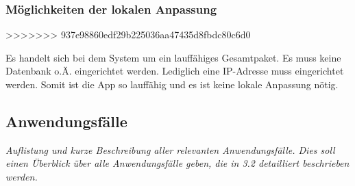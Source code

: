 \documentclass[fontsize=12pt,paper=a4,twoside]{scrartcl}
\begin{document}
\subsubsection{Möglichkeiten der lokalen Anpassung}
>>>>>>> 937e98860edf29b225036aa47435d8fbdc80c6d0

 Es handelt sich bei dem System um ein lauffähiges Gesamtpaket. Es muss keine Datenbank o.Ä. eingerichtet werden. Lediglich eine IP-Adresse muss eingerichtet werden. Somit ist die App so lauffähig und es ist keine lokale Anpassung nötig.


\subsection{Anwendungsfälle}
  {\em Auflistung und kurze Beschreibung aller relevanten
  Anwendungsfälle. Dies soll einen Überblick über alle Anwendungsfälle
  geben, die in 3.2 detailliert beschrieben werden.}
  
\end{document}
